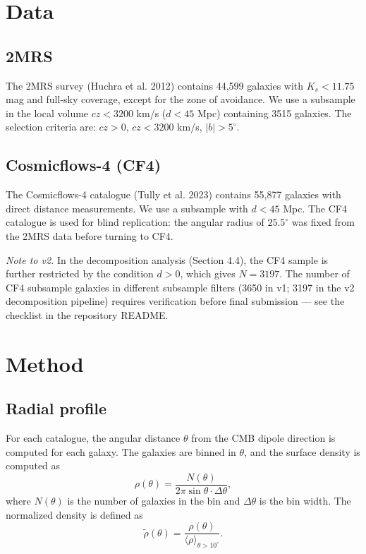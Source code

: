 \documentclass[11pt,a4paper]{article}
\begin{document}
\section{Data}
\subsection{2MRS}
The 2MRS survey (Huchra et al. 2012) contains 44,599 galaxies with \(K_s < 11.75\) mag and full-sky coverage, except for the zone of avoidance. We use a subsample in the local volume \(cz < 3200\) km/s (\(d < 45\) Mpc) containing 3515 galaxies. The selection criteria are: \(cz > 0\), \(cz < 3200\) km/s, \(|b| > 5^\circ\).

\subsection{Cosmicflows-4 (CF4)}
The Cosmicflows-4 catalogue (Tully et al. 2023) contains 55,877 galaxies with direct distance measurements. We use a subsample with \(d < 45\) Mpc. The CF4 catalogue is used for blind replication: the angular radius of \(25.5^\circ\) was fixed from the 2MRS data before turning to CF4.

\textit{Note to v2.} In the decomposition analysis (Section 4.4), the CF4 sample is further restricted by the condition \(d > 0\), which gives \(N = 3197\). The number of CF4 subsample galaxies in different subsample filters (3650 in v1; 3197 in the v2 decomposition pipeline) requires verification before final submission --- see the checklist in the repository README.

\section{Method}
\subsection{Radial profile}
For each catalogue, the angular distance \(\theta\) from the CMB dipole direction is computed for each galaxy. The galaxies are binned in \(\theta\), and the surface density is computed as
\begin{equation}
\rho(\theta) = \frac{N(\theta)}{2\pi \sin\theta \cdot \Delta\theta},
\end{equation}
where \(N(\theta)\) is the number of galaxies in the bin and \(\Delta\theta\) is the bin width. The normalized density is defined as
\begin{equation}
\tilde{\rho}(\theta) = \frac{\rho(\theta)}{\langle \rho \rangle_{\theta > 10^\circ}}.
\end{equation}
\end{document}
